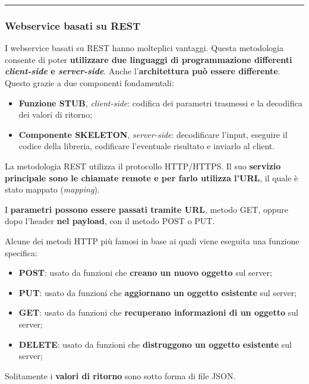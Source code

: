 \documentclass[a4paper]{article}
\newcommand{\longline}{\noindent\rule{\textwidth}{0.4pt}}
\begin{document}
	\longline
	
	\subsubsection{Webservice basati su REST}\label{webservice basati su REST}
	
	I webservice basati su REST hanno molteplici vantaggi. Questa metodologia consente di poter \textbf{utilizzare due linguaggi di programmazione differenti \emph{client-side} e \emph{server-side}}. Anche l'\textbf{architettura può essere differente}. Questo grazie a due componenti fondamentali:
	\begin{itemize}
		\item \textbf{Funzione STUB}, \emph{client-side}: codifica dei parametri trasmessi e la decodifica dei valori di ritorno;
		
		\item \textbf{Componente SKELETON}, \emph{server-side}: decodificare l'input, eseguire il codice della libreria, codificare l'eventuale risultato e inviarlo al client.
	\end{itemize}
	La metodologia REST utilizza il protocollo HTTP/HTTPS. Il suo \textbf{servizio principale sono le chiamate remote e per farlo utilizza l'URL}, il quale è stato mappato (\emph{mapping}).
	
	I \textbf{parametri possono essere passati tramite URL}, metodo GET, oppure dopo l'header \textbf{nel payload}, con il metodo POST o PUT.\newline
	
	\noindent
	Alcune dei metodi HTTP più famosi in base ai quali viene eseguita una funzione specifica:
	\begin{itemize}
		\item \textbf{POST}: usato da funzioni che \textbf{creano un nuovo oggetto} sul server;
		
		\item \textbf{PUT}: usato da funzioni che \textbf{aggiornano un oggetto esistente} sul server;
		
		\item \textbf{GET}: usato da funzioni che \textbf{recuperano informazioni di un oggetto} sul server;
		
		\item \textbf{DELETE}: usato da funzioni che \textbf{distruggono un oggetto esistente} sul server;
	\end{itemize}
	Solitamente i \textbf{valori di ritorno} sono sotto forma di file JSON.\newline
	
\end{document}
